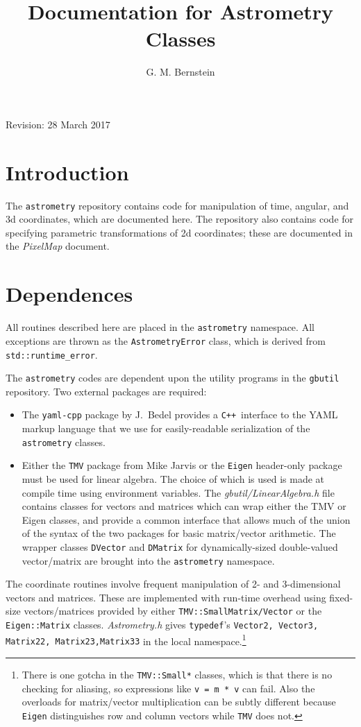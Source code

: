 \documentclass[11pt,preprint,flushrt]{aastex}
\newcommand{\cpp}{\texttt{C++}}
\begin{document}
\title{Documentation for Astrometry Classes}

\author{G. M. Bernstein}

\hspace*{\fill}Revision: 28 March 2017

\section{Introduction}
The \texttt{astrometry} repository contains code for manipulation of time, angular, and 3d coordinates, which are documented here.  The repository also contains code for specifying parametric transformations of 2d coordinates; these are documented in the \textit{PixelMap} document.

\section{Dependences}
All routines described here are placed in the {\tt astrometry} namespace.  All exceptions are thrown as the {\tt AstrometryError} class, which is derived from {\tt std::runtime\_error}.  

The \texttt{astrometry} codes are dependent upon the utility programs in the \texttt{gbutil} repository.  Two external packages are required:
\begin{itemize}
\item The \texttt{yaml-cpp} package by J.~Bedel provides a \cpp\ interface to the YAML markup language that we use for easily-readable serialization of the \texttt{astrometry} classes.
\item Either the \texttt{TMV} package from Mike Jarvis or the \texttt{Eigen} header-only package must be used for linear algebra.  The choice of which is used is made at compile time using environment variables.  The \textit{gbutil/LinearAlgebra.h} file contains classes for vectors and matrices which can wrap either the TMV or Eigen classes, and provide a common interface that allows much of the union of the syntax of the two packages for basic matrix/vector arithmetic.  The wrapper classes \texttt{DVector} and \texttt{DMatrix} for dynamically-sized double-valued vector/matrix are brought into the \texttt{astrometry} namespace.
\end{itemize}

The coordinate routines involve frequent manipulation of 2- and 3-dimensional vectors and matrices.  These are implemented with run-time overhead using fixed-size vectors/matrices provided by either \texttt{TMV::SmallMatrix/Vector} or the \texttt{Eigen::Matrix} classes.  
{\it Astrometry.h} gives {\tt typedef}'s  {\tt Vector2, Vector3, Matrix22, Matrix23,Matrix33} in the local namespace.\footnote{There is one gotcha in the {\tt TMV::Small*} classes, which is that there is no checking for aliasing, so expressions like {\tt v = m * v} can fail. Also the overloads for matrix/vector multiplication can be subtly different because \texttt{Eigen} distinguishes row and column vectors while \texttt{TMV} does not.}
\end{document}
